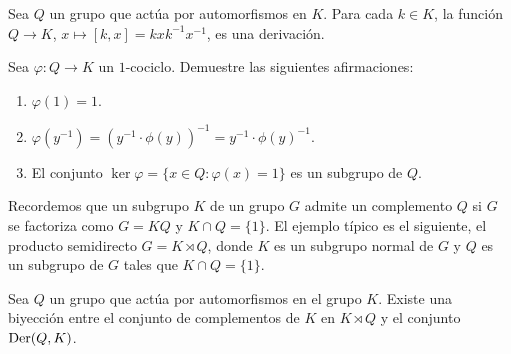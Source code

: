 \begin{example}
	Sea $Q$ un grupo que actúa por automorfismos en $K$. Para cada $k\in K$, la
	función $Q\to K$, $x\mapsto [k,x]=kxk^{-1}x^{-1}$, es una derivación.
\end{example}


\begin{exercise}
	\label{xca:1cocycle}
	Sea $\varphi\colon Q\to K$ un $1$-cociclo. Demuestre las siguientes afirmaciones:
	\begin{enumerate}
		\item $\varphi(1)=1$.
		\item $\varphi(y^{-1})=(y^{-1}\cdot\phi(y))^{-1}=y^{-1}\cdot\phi(y)^{-1}$.
		\item El conjunto $\ker\varphi=\{x\in Q:\varphi(x)=1\}$ 	es un
			subgrupo de $Q$. 
	\end{enumerate}
\end{exercise}

Recordemos que un subgrupo $K$ de un grupo $G$ admite un complemento $Q$ si 
$G$ se factoriza como 
$G=KQ$ y $K\cap Q=\{1\}$. 
El ejemplo típico es el siguiente, el producto semidirecto $G=K\rtimes Q$, donde $K$ es un subgrupo
normal de $G$ y $Q$ es un subgrupo de $G$ tales que $K\cap Q=\{1\}$. 

\begin{theorem}
	\label{theorem:complementos}
	Sea $Q$ un grupo que actúa por automorfismos en el grupo $K$.  Existe una
	biyección entre el conjunto de complementos de $K$ en $K\rtimes Q$ y el
	conjunto $\operatorname{Der}(Q,K)$.
\end{theorem}

